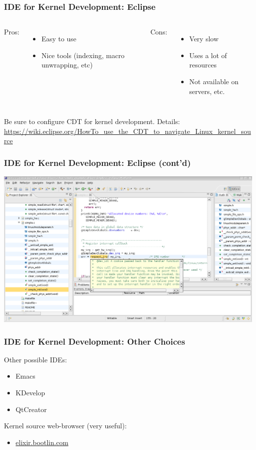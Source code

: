 \documentclass[aspectratio=169]{beamer}
\begin{document}
\begin{frame}
  \frametitle{IDE for Kernel Development: Eclipse}
  \begin{columns}
    Pros:
    \begin{itemize}
      \item Easy to use
      \item Nice tools (indexing, macro unwrapping, etc)
    \end{itemize}
    Cons:
    \begin{itemize}
      \item Very slow
      \item Uses a lot of resources
      \item Not available on servers, etc.
    \end{itemize}
  \end{columns}
  \bigskip
  Be sure to configure CDT for kernel development.
  Details: \href{https://wiki.eclipse.org/HowTo\_use\_the\_CDT\_to\_navigate\_Linux\_kernel\_source}
                {https://wiki.eclipse.org/HowTo\_use\_the\_CDT\_to\_navigate\_Linux\_kernel\_source}
\end{frame}

\begin{frame}
  \frametitle{IDE for Kernel Development: Eclipse (cont'd)}
  \begin{center}
    \includegraphics[scale=0.35]{images/eclipse.png}
  \end{center}
  \vspace*{-10mm} %
\end{frame}

\begin{frame}
  \frametitle{IDE for Kernel Development: Other Choices}
  Other possible IDEs:
  \begin{itemize}
    \item Emacs
    \item KDevelop
    \item QtCreator
  \end{itemize}

  Kernel source web-browser (very useful):
  \begin{itemize}
    \item \href{elixir.bootlin.com}{elixir.bootlin.com}
  \end{itemize}
\end{frame}
\end{document}
